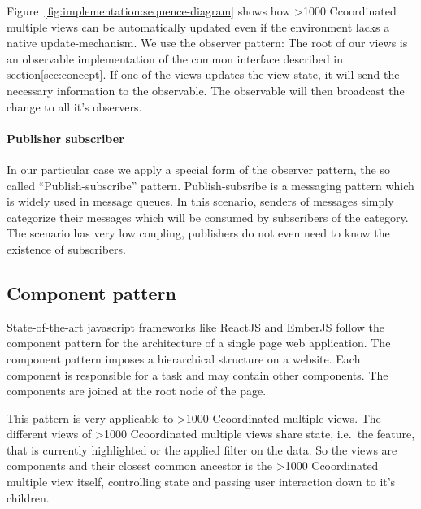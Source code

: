 \documentclass{article}
\newcommand\hmm[1]{\ifnum\ifhmode\spacefactor\else2000\fi>1000 \uppercase{#1}\else#1\fi}
\newcommand{\cmv}{\hmm{c}oordinated multiple view}
\newcommand{\cmvs}{\hmm{c}oordinated multiple views}
\begin{document}
Figure~\ref{fig:implementation:sequence-diagram} shows how \cmvs{} can be automatically updated even if the environment lacks a native update-mechanism.
We use the observer pattern:
The root of our views is an observable implementation of the common interface described in section\ref{sec:concept}.
If one of the views updates the view state, it will send the necessary information to the observable.
The observable will then broadcast the change to all it's observers.


\paragraph{Publisher subscriber}
In our particular case we apply a special form of the observer pattern, the so called ``Publish-subscribe'' pattern\cite{Eugster2003}.
Publish-subsribe is a messaging pattern which is widely used in message queues.
In this scenario, senders of messages simply categorize their messages which will be consumed by subscribers of the category.
The scenario has very low coupling, publishers do not even need to know the existence of subscribers.


\subsection{Component pattern}
State-of-the-art javascript frameworks like ReactJS and EmberJS follow the component pattern for the architecture of a single page web application.
The component pattern imposes a hierarchical structure on a website.
Each component is responsible for a task and may contain other components.
The components are joined at the root node of the page.

This pattern is very applicable to \cmvs{}.
The different views of \cmvs{} share state, i.e.\ the feature, that is currently highlighted or the applied filter on the data.
So the views are components and their closest common ancestor is the \cmv{} itself, controlling state and passing user interaction down to it's children.
\end{document}
